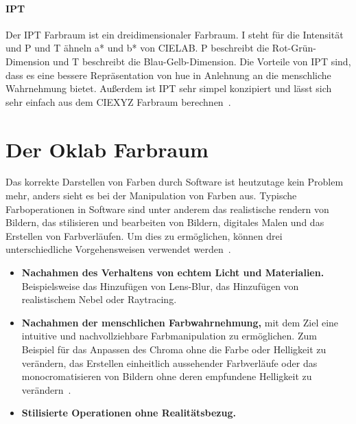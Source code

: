 \documentclass[12pt, a4paper, ngerman]{article}
\begin{document}
\paragraph{IPT}
Der \acs{IPT} Farbraum ist ein dreidimensionaler Farbraum.
I steht für die Intensität und P und T ähneln a* und b* von CIELAB. 
P beschreibt die Rot-Grün-Dimension und T beschreibt die Blau-Gelb-Dimension.
Die Vorteile von IPT sind, dass es eine bessere Repräsentation von hue 
in Anlehnung an die menschliche Wahrnehmung bietet. 
Außerdem ist IPT sehr simpel konzipiert und lässt sich sehr einfach aus dem CIEXYZ Farbraum berechnen~\cite{Ebner_1998}.

\section{Der Oklab Farbraum}
Das korrekte Darstellen von Farben durch Software ist heutzutage kein Problem mehr, 
anders sieht es bei der Manipulation von Farben aus.
Typische Farboperationen in Software sind unter anderem das realistische rendern von Bildern, 
das stilisieren und bearbeiten von Bildern, digitales Malen und das Erstellen von Farbverläufen. 
Um dies zu ermöglichen, können drei unterschiedliche Vorgehensweisen verwendet werden~\cite{Ottosson_2020}.
\begin{itemize}
  \item \textbf{Nachahmen des Verhaltens von echtem Licht und Materialien.} Beispielsweise das Hinzufügen von Lens-Blur, das Hinzufügen von realistischem Nebel oder Raytracing.
  \item \textbf{Nachahmen der menschlichen Farbwahrnehmung,} mit dem Ziel eine intuitive und nachvollziehbare Farbmanipulation zu ermöglichen. Zum Beispiel für das Anpassen des Chroma ohne die Farbe oder Helligkeit zu verändern, das Erstellen einheitlich aussehender Farbverläufe oder das monocromatisieren von Bildern ohne deren empfundene Helligkeit zu verändern~\cite{Oklab_2020}.
  \item \textbf{Stilisierte Operationen ohne Realitätsbezug.} 
\end{itemize}
\end{document}
